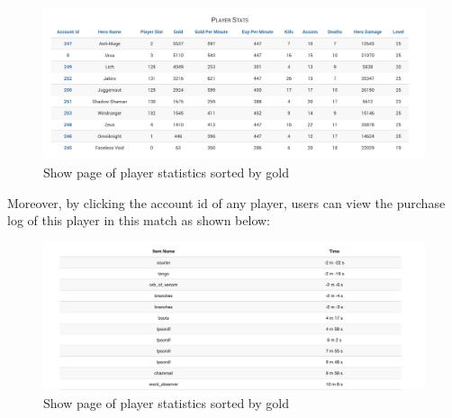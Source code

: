 \documentclass[a4paper]{article}
\begin{document}
\begin{figure}[H]
\centering
\includegraphics[width=1.0\textwidth]{show_gold_sorted.png}
\caption{\label{fig:fig6}Show page of player statistics sorted by gold}
\end{figure}
\noindent Moreover, by clicking the account id of any player, users can view the purchase log of this player in this match as shown below:
\begin{figure}[H]
\centering
\includegraphics[width=1.0\textwidth]{purchase.png}
\caption{\label{fig:fig7}Show page of player statistics sorted by gold}
\end{figure}
\end{document}
